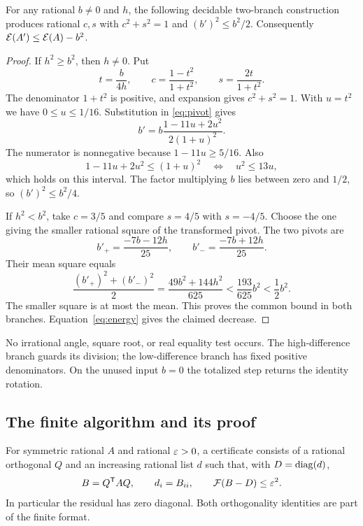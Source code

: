 \begin{lemma}
\label{lem:pivot}
For any rational $b\ne0$ and $h$, the following decidable two-branch construction produces rational $c,s$ with $c^2+s^2=1$ and $(b')^2\le b^2/2$. Consequently $\mathcal E(A')\le\mathcal E(A)-b^2$.
\end{lemma}
\begin{proof}
If $h^2\ge b^2$, then $h\ne0$. Put
\[
 t=\frac b{4h},\qquad
 c=\frac{1-t^2}{1+t^2},\qquad s=\frac{2t}{1+t^2}.
\]
The denominator $1+t^2$ is positive, and expansion gives $c^2+s^2=1$. With $u=t^2$ we have $0\le u\le1/16$. Substitution in \eqref{eq:pivot} gives
\[
 b'=b\frac{1-11u+2u^2}{2(1+u)^2}.
\]
The numerator is nonnegative because $1-11u\ge5/16$. Also
\[
 1-11u+2u^2\le(1+u)^2
 \quad\Longleftrightarrow\quad u^2\le13u,
\]
which holds on this interval. The factor multiplying $b$ lies between zero and $1/2$, so $(b')^2\le b^2/4$.

If $h^2<b^2$, take $c=3/5$ and compare $s=4/5$ with $s=-4/5$. Choose the one giving the smaller rational square of the transformed pivot. The two pivots are
\[
 b'_+=\frac{-7b-12h}{25},\qquad
 b'_- =\frac{-7b+12h}{25}.
\]
Their mean square equals
\[
 \frac{(b'_+)^2+(b'_-)^2}{2}
 =\frac{49b^2+144h^2}{625}
 <\frac{193}{625}b^2<\frac12b^2.
\]
The smaller square is at most the mean. This proves the common bound in both branches. Equation~\eqref{eq:energy} gives the claimed decrease.
\end{proof}

No irrational angle, square root, or real equality test occurs. The high-difference branch guards its division; the low-difference branch has fixed positive denominators. On the unused input $b=0$ the totalized step returns the identity rotation.

\subsection{The finite algorithm and its proof}

\begin{definition}
\label{def:diagonalcertificate}
For symmetric rational $A$ and rational $\varepsilon>0$, a certificate consists of a rational orthogonal $Q$ and an increasing rational list $d$ such that, with $D=\operatorname{diag}(d)$,
\[
 B=Q^{\mathsf T}AQ,\qquad d_i=B_{ii},\qquad
 \mathcal F(B-D)\le\varepsilon^2.
\]
In particular the residual has zero diagonal. Both orthogonality identities are part of the finite format.
\end{definition}

